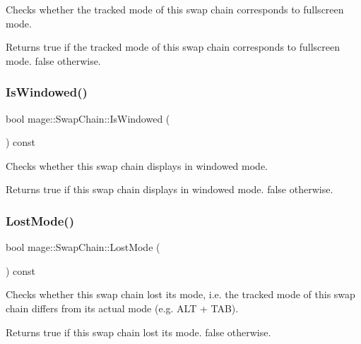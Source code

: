 Checks whether the tracked mode of this swap chain corresponds to fullscreen mode.

\begin{DoxyReturn}{Returns}
{\ttfamily true} if the tracked mode of this swap chain corresponds to fullscreen mode. {\ttfamily false} otherwise. 
\end{DoxyReturn}
\hypertarget{classmage_1_1_swap_chain_a7cf71ec46d0af888b9b1daa890a54d39}{}\label{classmage_1_1_swap_chain_a7cf71ec46d0af888b9b1daa890a54d39} 
\subsubsection{\texorpdfstring{Is\+Windowed()}{IsWindowed()}}
{\footnotesize\ttfamily bool mage\+::\+Swap\+Chain\+::\+Is\+Windowed (\begin{DoxyParamCaption}{ }\end{DoxyParamCaption}) const\hspace{0.3cm}{\ttfamily [noexcept]}}

Checks whether this swap chain displays in windowed mode.

\begin{DoxyReturn}{Returns}
{\ttfamily true} if this swap chain displays in windowed mode. {\ttfamily false} otherwise. 
\end{DoxyReturn}
\hypertarget{classmage_1_1_swap_chain_aba3697d2b641b99f7e89fcc59613f89d}{}\label{classmage_1_1_swap_chain_aba3697d2b641b99f7e89fcc59613f89d} 
\subsubsection{\texorpdfstring{Lost\+Mode()}{LostMode()}}
{\footnotesize\ttfamily bool mage\+::\+Swap\+Chain\+::\+Lost\+Mode (\begin{DoxyParamCaption}{ }\end{DoxyParamCaption}) const\hspace{0.3cm}{\ttfamily [noexcept]}}

Checks whether this swap chain lost its mode, i.\+e. the tracked mode of this swap chain differs from its actual mode (e.\+g. A\+LT + T\+AB).

\begin{DoxyReturn}{Returns}
{\ttfamily true} if this swap chain lost its mode. {\ttfamily false} otherwise. 
\end{DoxyReturn}
\hypertarget{classmage_1_1_swap_chain_a8ea6de219f37d447487d7d3b4bbd5867}{}\label{classmage_1_1_swap_chain_a8ea6de219f37d447487d7d3b4bbd5867} 
